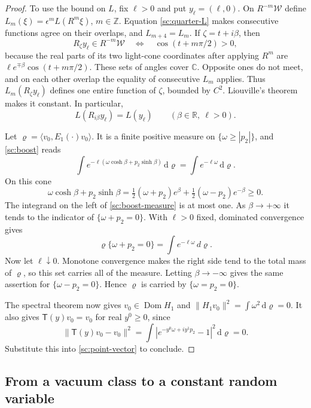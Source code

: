 \documentclass[11pt,letterpaper,reqno]{amsart}
\theoremstyle{definition}
\theoremstyle{remark}
\begin{document}
\begin{proof}
To use the bound on $L$, fix $\ell>0$ and put $y_\ell=(\ell,0)$.
On $R^{-m}\mathcal W$ define
$L_m(\xi)=\epsilon^mL(R^m\xi)$, $m\in\mathbb Z$.
Equation \eqref{sc:quarter-L} makes consecutive functions agree on their
overlaps, and $L_{m+4}=L_m$. If $\zeta=t+i\beta$, then
\[
R_\zeta y_\ell\in R^{-m}\mathcal W
 \quad\Longleftrightarrow\quad \cos(t+m\pi/2)>0,
\]
because the real parts of its two light-cone coordinates after applying
$R^m$ are $\ell e^{\mp\beta}\cos(t+m\pi/2)$.
These sets of angles cover $\mathbb C$. Opposite ones do not meet, and on
each other overlap the equality of consecutive $L_m$ applies. Thus
$L_m(R_\zeta y_\ell)$ defines one entire function of $\zeta$, bounded by
$C^2$. Liouville's theorem \cite[Theorem 6.16]{Dunkel} makes it constant. In particular,
\begin{equation}\label{sc:boost}
L(R_{i\beta}y_\ell)=L(y_\ell)
\qquad(\beta\in\mathbb R,\ \ell>0).
\end{equation}

Let $\varrho=\langle v_0,E_1(\cdot)v_0\rangle$.
It is a finite positive measure on $\{\omega\ge|p_2|\}$, and
\eqref{sc:boost} reads
\begin{equation}\label{sc:boost-measure}
\int e^{-\ell(\omega\cosh\beta+p_2\sinh\beta)}\,\mathrm d\varrho
 =\int e^{-\ell\omega}\,\mathrm d\varrho.
\end{equation}
On this cone
\[
\omega\cosh\beta+p_2\sinh\beta
 =\tfrac12(\omega+p_2)e^\beta+\tfrac12(\omega-p_2)e^{-\beta}\ge0.
\]
The integrand on the left of \eqref{sc:boost-measure} is at most one.
As $\beta\to+\infty$ it tends to the indicator of
$\{\omega+p_2=0\}$. With $\ell>0$ fixed, dominated convergence gives
\[
 \varrho\{\omega+p_2=0\}=\int e^{-\ell\omega}\,d\varrho.
\]
Now let $\ell\downarrow0$. Monotone convergence makes the right side
tend to the total mass of $\varrho$, so this set carries all of the
measure.
Letting $\beta\to-\infty$ gives the same assertion for
$\{\omega-p_2=0\}$. Hence $\varrho$ is carried by
$\{\omega=p_2=0\}$.

The spectral theorem now gives
$v_0\in\operatorname{Dom}H_1$ and
$\|H_1v_0\|^2=\int\omega^2\,\mathrm d\varrho=0$.
It also gives $\mathsf T(y)v_0=v_0$ for real $y^0\ge0$, since
\[
\|\mathsf T(y)v_0-v_0\|^2
 =\int|e^{-y^0\omega+iy^1p_2}-1|^2\,\mathrm d\varrho=0.
\]
Substitute this into \eqref{sc:point-vector} to conclude.
\end{proof}

\subsection{From a vacuum class to a constant random variable}
\end{document}
